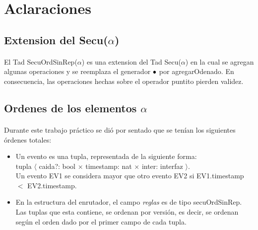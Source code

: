 \section*{Aclaraciones}

\subsection*{Extension del Secu($\alpha$)}
\paragraph{}
El Tad SecuOrdSinRep($\alpha$) es una extension del Tad Secu($\alpha$) en la cual se agregan algunas operaciones y se reemplaza el generador $\bullet$ por agregarOdenado. En consecuencia, las operaciones hechas sobre el operador puntito pierden validez.

\subsection*{Ordenes de los elementos $\alpha$}
\paragraph{}
Durante este trabajo pr\'actico se di\'o por sentado que se ten\'ian los siguientes \'ordenes totales:

\begin{itemize}
 \item Un evento es una tupla, representada de la siguiente forma: \\
tupla $\langle$ caida?: bool  $\times$ timestamp: nat $\times$ inter: interfaz  $\rangle$.\\
Un evento EV1 se considera mayor que otro evento EV2 si EV1.timestamp $<$ EV2.timestamp.
\item En la estructura del enrutador, el campo \textit{reglas} es de tipo secuOrdSinRep. Las tuplas que esta contiene, se ordenan por versi\'on, es decir, se ordenan seg\'un el orden dado por el primer campo de cada tupla.
\end{itemize}




